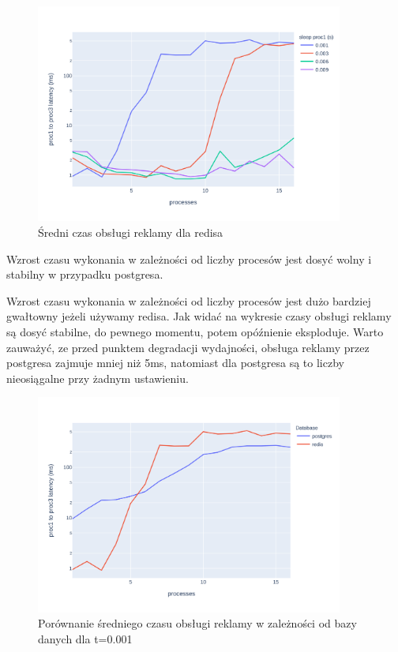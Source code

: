 \documentclass[polish, 10pt]{article}
\begin{document}
\begin{figure}[H]
    \centering
    \includegraphics[width=0.9\textwidth]{./graphs/diff_in_end_redis_all_sleeps.png}
    \caption{Średni czas obsługi reklamy dla redisa}
\end{figure}

Wzrost czasu wykonania w zależności od liczby procesów jest dosyć wolny i stabilny w przypadku postgresa.

Wzrost czasu wykonania w zależności od liczby procesów jest dużo bardziej gwałtowny jeżeli używamy redisa. Jak widać na wykresie czasy obsługi reklamy są dosyć stabilne, do pewnego momentu, potem opóźnienie eksploduje. Warto zauważyć, ze przed punktem degradacji wydajności, obsługa reklamy przez postgresa zajmuje mniej niż 5ms, natomiast dla postgresa są to liczby nieosiągalne przy żadnym ustawieniu.

\begin{figure}[H]
    \centering
    \includegraphics[width=0.9\textwidth]{./graphs/diff_in_end_postgres_vs_redis0001.png}
    \caption{Porównanie średniego czasu obsługi reklamy w zależności od bazy danych dla t=0.001}
\end{figure}
\end{document}
